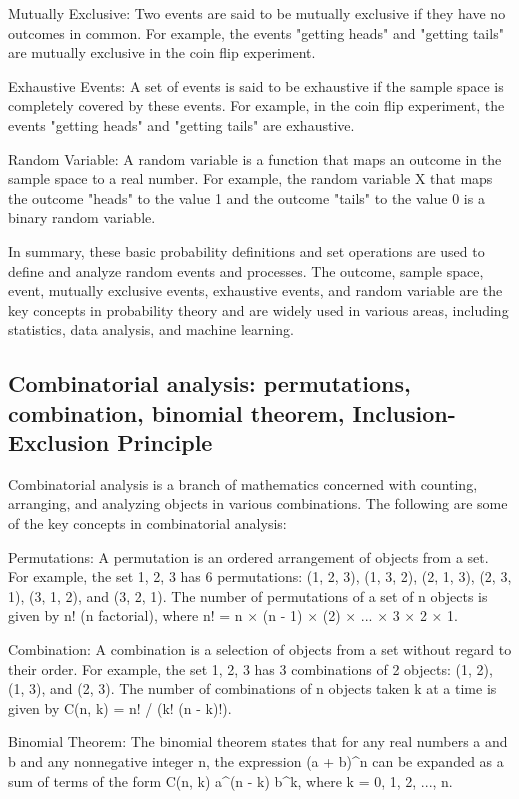 \documentclass[12pt, a4paper, oneside]{article}
\begin{document}
Mutually Exclusive: Two events are said to be mutually exclusive if they have no outcomes in common. For example, the events "getting heads" and "getting tails" are mutually exclusive in the coin flip experiment.

Exhaustive Events: A set of events is said to be exhaustive if the sample space is completely covered by these events. For example, in the coin flip experiment, the events "getting heads" and "getting tails" are exhaustive.

Random Variable: A random variable is a function that maps an outcome in the sample space to a real number. For example, the random variable X that maps the outcome "heads" to the value 1 and the outcome "tails" to the value 0 is a binary random variable.

In summary, these basic probability definitions and set operations are used to define and analyze random events and processes. The outcome, sample space, event, mutually exclusive events, exhaustive events, and random variable are the key concepts in probability theory and are widely used in various areas, including statistics, data analysis, and machine learning.
\subsection{ Combinatorial analysis: permutations, combination, binomial theorem, Inclusion-Exclusion Principle }
Combinatorial analysis is a branch of mathematics concerned with counting, arranging, and analyzing objects in various combinations. The following are some of the key concepts in combinatorial analysis:

Permutations: A permutation is an ordered arrangement of objects from a set. For example, the set {1, 2, 3} has 6 permutations: (1, 2, 3), (1, 3, 2), (2, 1, 3), (2, 3, 1), (3, 1, 2), and (3, 2, 1). The number of permutations of a set of n objects is given by n! (n factorial), where n! = n × (n - 1) × (2) × ... × 3 × 2 × 1.

Combination: A combination is a selection of objects from a set without regard to their order. For example, the set {1, 2, 3} has 3 combinations of 2 objects: (1, 2), (1, 3), and (2, 3). The number of combinations of n objects taken k at a time is given by C(n, k) = n! / (k! (n - k)!).

Binomial Theorem: The binomial theorem states that for any real numbers a and b and any nonnegative integer n, the expression (a + b)^n can be expanded as a sum of terms of the form C(n, k) a^(n - k) b^k, where k = 0, 1, 2, ..., n.
\end{document}
